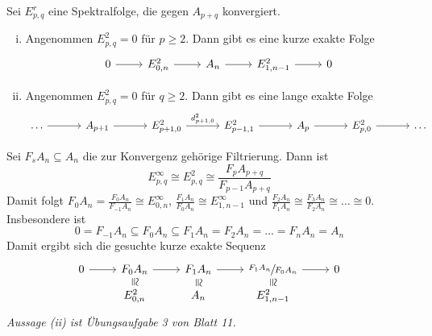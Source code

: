 \begin{lemma}[{name=[{exakte Folgen mit Moduln der $2$-Seite}]},label=lem:kes_konvergente_spektralfolge]
	Sei $E^r_{p,q}$ eine Spektralfolge, die gegen $A_{p+q}$ konvergiert. 
	\begin{enumerate}[(i),itemsep=0pt]
		\item Angenommen $E^2_{p,q}=0$ für $p\ge 2$.
		Dann gibt es eine kurze exakte Folge 
		\[
			\begin{tikzcd}
				0 \rar & E^2_{0,n} \rar & A_n \rar & E^2_{1,n-1} \rar & 0
			\end{tikzcd}
		\]
		\item Angenommen $E^2_{p,q}=0$ für $q \ge 2$. 
		Dann gibt es eine lange exakte Folge
		\[
			\begin{tikzcd}[sep=3.2em]
				\ldots \rar & A_{p+1} \rar & E^2_{p+1,0} \rar["d^2_{p+1,0}"] & E^2_{p-1,1} \rar & A_p \rar & E^2_{p,0} \rar & \ldots 
			\end{tikzcd}
		\] 
	\end{enumerate}
\end{lemma}
\begin{beweis}
	Sei $F_s A_n \subseteq A_n$ die zur Konvergenz gehörige Filtrierung. 
	Dann ist 
	\[
		E^\infty_{p,q} \cong E_{p,q}^2 \cong \frac{F_p A_{p+q}}{F_{p-1}A_{p+q}} 
	\]
	Damit folgt $F_0 A_n = \frac{F_0 A_n}{F_{-1} A_n} \cong E^\infty_{0,n}$, $\frac{F_1 A_n}{F_0 A_n} \cong E^\infty_{1,n-1}$ und $\frac{F_{2}A_n}{F_{1}A_n} \cong \frac{F_{3} A_n}{F_{2} A_n} \cong \ldots \cong 0$.
	Insbesondere ist 
	\[
		0 = F_{-1} A_n \subseteq F_0 A_n \subseteq F_1 A_n = F_{2}A_n = \ldots = F_{n} A_n = A_n
	\]
	Damit ergibt sich die gesuchte kurze exakte Sequenz
	\[
		\begin{tikzcd}[row sep=5pt]
			0 \rar & F_{0} A_n \rar \dar[phantom,"\cong", sloped] & F_1 A_n \rar\dar[phantom,"\cong", sloped] & \sfrac{F_1 A_n}{F_{0} A_n} \rar\dar[phantom,"\cong", sloped] &0  \\
			& E^2_{0,n} & A_n & E_{1,n-1}^2
		\end{tikzcd}
	\]
	\emph{Aussage (ii) ist Übungsaufgabe 3 von Blatt 11.}
\end{beweis}

